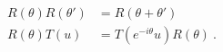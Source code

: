 \begin{equation}
  \label{eq:esg}
  \begin{split}
    R(\theta) R(\theta') &= R(\theta + \theta')\\
    R(\theta) T(u) &= T(e^{-i\theta}u) R(\theta)~.
  \end{split}
\end{equation}

